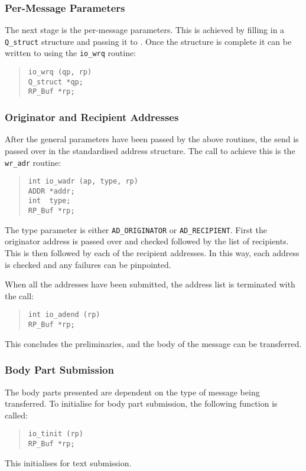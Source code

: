 \subsubsection{Per-Message Parameters}

The next stage is the per-message parameters. This is achieved by
filling in a \verb|Q_struct| structure and passing it
to .
Once the structure is complete it can be written to  using the
\verb|io_wrq| routine:
\begin{quote}\begin{verbatim}
io_wrq (qp, rp)
Q_struct *qp;
RP_Buf *rp;
\end{verbatim}\end{quote}


\subsubsection{Originator and Recipient Addresses}

After the general parameters have been passed by the above routines,
the send is passed over in the standardised address structure.
The call to achieve this is the \verb|wr_adr| routine:
\begin{quote}\begin{verbatim}
int io_wadr (ap, type, rp)
ADDR *addr;
int  type;
RP_Buf *rp;
\end{verbatim}\end{quote}
The type parameter is either \verb|AD_ORIGINATOR| or
\verb|AD_RECIPIENT|.  First the originator address is passed over and
checked followed by the list of recipients. This is then followed by
each of the recipient addresses.  In this way, each address is checked
and any failures can be pinpointed. 

When all the addresses have been submitted, the address list is
terminated with the call:
\begin{quote}\begin{verbatim}
int io_adend (rp)
RP_Buf *rp;
\end{verbatim}\end{quote}
This concludes the preliminaries, and the body of the message can be
transferred.

\subsubsection{Body Part Submission}

The body parts presented are dependent on the type of message being
transferred.  To initialise for body part submission, the following
function is called:
\begin{quote}\begin{verbatim}
io_tinit (rp)
RP_Buf *rp;
\end{verbatim}\end{quote}
This initialises for text submission.


